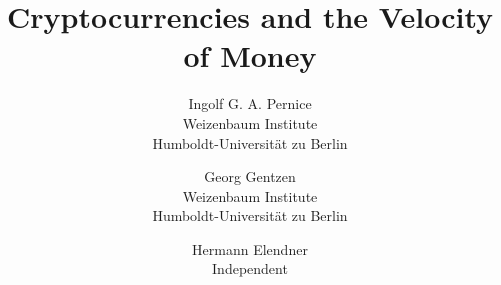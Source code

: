 %
%
% 


\title{\Large \bf Cryptocurrencies and the Velocity of Money}

\author{
	{\rm Ingolf G. A. Pernice}\\
	Weizenbaum Institute\\Humboldt-Universität zu Berlin
	\and
	{\rm Georg Gentzen}\\
	Weizenbaum Institute\\Humboldt-Universität zu Berlin
	\and
	{\rm Hermann Elendner}\\
        Independent
	\mbox{}
} %

%
\def \varInputTable {}
\def \varInputFigs  {}
\def \varInputAlgos {}

\newcommand{\parRemain}[1]{#1} %

